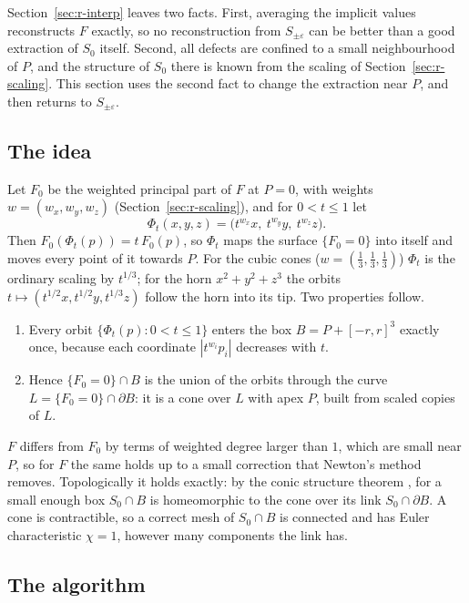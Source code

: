 \documentclass[12pt, a4paper]{article}
\theoremstyle{plain}
\theoremstyle{definition}
\theoremstyle{remark}
\theoremstyle{definition}
\begin{document}
Section~\ref{sec:r-interp} leaves two facts. First, averaging the implicit values
reconstructs $F$ exactly, so no reconstruction from $S_{\pm\varepsilon}$ can be better
than a good extraction of $S_0$ itself. Second, all defects are confined to a small
neighbourhood of $P$, and the structure of $S_0$ there is known from the scaling of
Section~\ref{sec:r-scaling}. This section uses the second fact to change the
extraction near $P$, and then returns to $S_{\pm\varepsilon}$.

\subsection{The idea}
\label{sec:r-cone-idea}

Let $F_0$ be the weighted principal part of $F$ at $P=0$, with weights
$w=(w_x,w_y,w_z)$ (Section~\ref{sec:r-scaling}), and for $0<t\le1$ let
\[
\Phi_t(x,y,z)=\big(t^{w_x}x,\ t^{w_y}y,\ t^{w_z}z\big).
\]
Then $F_0(\Phi_t(p))=t\,F_0(p)$, so $\Phi_t$ maps the surface $\{F_0=0\}$ into itself
and moves every point of it towards $P$. For the cubic cones ($w=(\tfrac13,\tfrac13,\tfrac13)$)
$\Phi_t$ is the ordinary scaling by $t^{1/3}$; for the horn $x^2+y^2+z^3$ the orbits
$t\mapsto(t^{1/2}x,t^{1/2}y,t^{1/3}z)$ follow the horn into its tip. Two properties
follow.
\begin{enumerate}
    \item Every orbit $\{\Phi_t(p):0<t\le1\}$ enters the box $B=P+[-r,r]^3$ exactly
          once, because each coordinate $|t^{w_i}p_i|$ decreases with $t$.
    \item Hence $\{F_0=0\}\cap B$ is the union of the orbits through the curve
          $L=\{F_0=0\}\cap\partial B$: it is a cone over $L$ with apex $P$, built from
          scaled copies of $L$.
\end{enumerate}
$F$ differs from $F_0$ by terms of weighted degree larger than $1$, which are small
near $P$, so for $F$ the same holds up to a small correction that Newton's method
removes. Topologically it holds exactly: by the conic structure theorem
\cite{milnor1968singular}, for a small enough box $S_0\cap B$ is homeomorphic to the
cone over its link $S_0\cap\partial B$. A cone is contractible, so a correct mesh of
$S_0\cap B$ is connected and has Euler characteristic $\chi=1$, however many components
the link has.

\subsection{The algorithm}
\label{sec:r-cone-algorithm}
\end{document}
